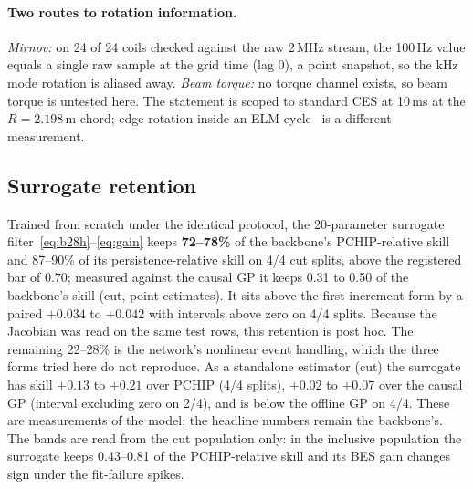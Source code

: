 \documentclass[10pt,twocolumn,letterpaper]{article}
\begin{document}
\paragraph{Two routes to rotation information.} \emph{Mirnov:} on 24 of 24
coils checked against the raw 2\,MHz stream, the 100\,Hz value equals a single raw
sample at the grid time (lag 0), a point snapshot, so the kHz mode rotation is aliased
away. \emph{Beam
torque:} no torque channel exists, so beam torque is untested here. The statement is
scoped to standard CES at 10\,ms at the $R = 2.198$\,m chord; edge rotation inside an
ELM cycle~\citep{Viezzer2020Dynamics} is a different measurement.

\subsection{Surrogate retention}
\label{sec:res:eq}
Trained from scratch under the identical protocol, the 20-parameter surrogate
filter~\eqref{eq:b28h}--\eqref{eq:gain} keeps \textbf{72--78\%} of the backbone's
PCHIP-relative skill and 87--90\% of its persistence-relative skill on 4/4 cut splits,
above the registered bar of 0.70; measured against the causal GP it keeps 0.31 to 0.50
of the backbone's skill (cut, point estimates). It sits above the first increment form
by a paired $+0.034$ to $+0.042$ with intervals above zero on 4/4 splits. Because the
Jacobian was read on the same test rows, this retention is post hoc. The remaining
22--28\% is the network's nonlinear event handling, which the three forms tried here do
not reproduce. As a standalone estimator (cut) the surrogate has skill $+0.13$ to
$+0.21$ over PCHIP (4/4 splits), $+0.02$ to $+0.07$ over the causal GP (interval
excluding zero on 2/4), and is below the offline GP on 4/4. These are measurements of
the model; the headline numbers remain the backbone's. The bands are read from the cut population only: in
the inclusive population the surrogate keeps 0.43--0.81 of the PCHIP-relative skill and
its BES gain changes sign under the fit-failure spikes.
\end{document}
